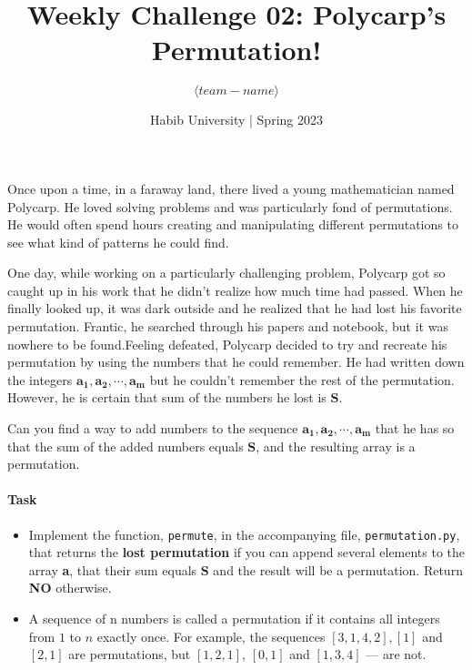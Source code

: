 \documentclass[a4paper]{exam}
\title{Weekly Challenge 02: Polycarp's Permutation!}
\author{$\langle team-name \rangle$}  %
\date{Habib University | Spring 2023}
\begin{document}
\maketitle

\begin{questions}

    Once upon a time, in a faraway land, there lived a young mathematician named Polycarp.
    He loved solving problems and was particularly fond of permutations. He would often
    spend hours creating and manipulating different permutations to see what kind of
    patterns he could find.

    One day, while working on a particularly challenging problem, Polycarp got so caught up
    in his work that he didn't realize how much time had passed. When he finally looked up,
    it was dark outside and he realized that he had lost his favorite permutation. Frantic,
    he searched through his papers and notebook, but it was nowhere to be found.Feeling
    defeated, Polycarp decided to try and recreate his permutation by using the numbers
    that he could remember. He had written down the integers $\mathbf{a_1, a_2, \cdots , a_m}$
    but he couldn't remember the rest of the permutation.  However, he is certain that
    sum of the numbers he lost is $\mathbf{S}$.

    Can you find a way to add numbers to the sequence $\mathbf{a_1,a_2,\cdots, a_m}$ that he has
    so that the sum of the added numbers equals $\mathbf{S}$, and the resulting array is a permutation.




    \paragraph{Task}
    \begin{itemize}
        \item Implement the function, \texttt{permute}, in the accompanying file,  \texttt{permutation.py},
        that returns the \textbf{lost permutation} if you can append several elements to the array \textbf{a},
        that their sum equals $\mathbf{S}$ and the result will be a permutation. Return \textbf{NO} otherwise.
    
        \item A sequence of n numbers is called a permutation if it contains all integers from $1$ to $n$
              exactly once. For example, the sequences $[3,1,4,2], [1]$  and $[2,1]$ are permutations, but $[1,2,1]$,
              $[0,1]$ and $[1,3,4]$ — are not.


\end{itemize}
\end{questions}
\end{document}
